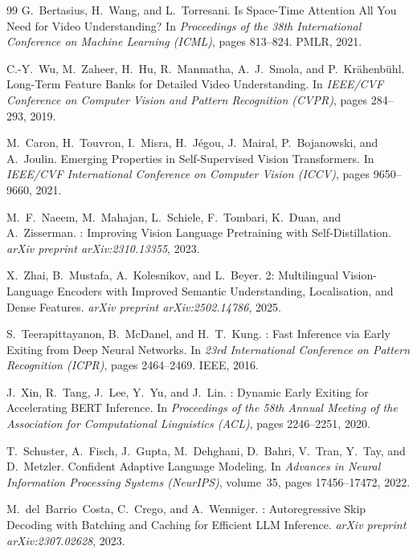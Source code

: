 \documentclass{article}
\begin{document}
\begin{thebibliography}{99}
G.~Bertasius, H.~Wang, and L.~Torresani.
\newblock Is Space-Time Attention All You Need for Video Understanding?
\newblock In \emph{Proceedings of the 38th International Conference on Machine Learning (ICML)}, pages 813--824. PMLR, 2021.

C.-Y.~Wu, M.~Zaheer, H.~Hu, R.~Manmatha, A.~J.~Smola, and P.~Kr\"ahenb\"uhl.
\newblock Long-Term Feature Banks for Detailed Video Understanding.
\newblock In \emph{IEEE/CVF Conference on Computer Vision and Pattern Recognition (CVPR)}, pages 284--293, 2019.

M.~Caron, H.~Touvron, I.~Misra, H.~J\'egou, J.~Mairal, P.~Bojanowski, and A.~Joulin.
\newblock Emerging Properties in Self-Supervised Vision Transformers.
\newblock In \emph{IEEE/CVF International Conference on Computer Vision (ICCV)}, pages 9650--9660, 2021.

M.~F.~Naeem, M.~Mahajan, L.~Schiele, F.~Tombari, K.~Duan, and A.~Zisserman.
: Improving Vision Language Pretraining with Self-Distillation.
\newblock \emph{arXiv preprint arXiv:2310.13355}, 2023.

X.~Zhai, B.~Mustafa, A.~Kolesnikov, and L.~Beyer.
 2: Multilingual Vision-Language Encoders with Improved Semantic Understanding, Localisation, and Dense Features.
\newblock \emph{arXiv preprint arXiv:2502.14786}, 2025.

S.~Teerapittayanon, B.~McDanel, and H.~T.~Kung.
: Fast Inference via Early Exiting from Deep Neural Networks.
\newblock In \emph{23rd International Conference on Pattern Recognition (ICPR)}, pages 2464--2469. IEEE, 2016.

J.~Xin, R.~Tang, J.~Lee, Y.~Yu, and J.~Lin.
: Dynamic Early Exiting for Accelerating {BERT} Inference.
\newblock In \emph{Proceedings of the 58th Annual Meeting of the Association for Computational Linguistics (ACL)}, pages 2246--2251, 2020.

T.~Schuster, A.~Fisch, J.~Gupta, M.~Dehghani, D.~Bahri, V.~Tran, Y.~Tay, and D.~Metzler.
\newblock Confident Adaptive Language Modeling.
\newblock In \emph{Advances in Neural Information Processing Systems (NeurIPS)}, volume~35, pages 17456--17472, 2022.

M.~del~Barrio~Costa, C.~Crego, and A.~Wenniger.
: Autoregressive Skip Decoding with Batching and Caching for Efficient {LLM} Inference.
\newblock \emph{arXiv preprint arXiv:2307.02628}, 2023.


\end{thebibliography}
\end{document}
